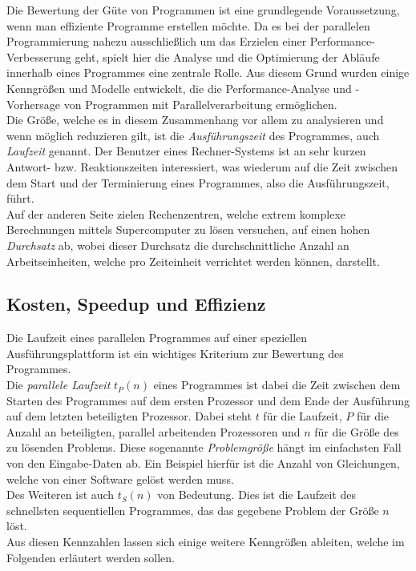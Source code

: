 		Die Bewertung der Güte von Programmen ist eine grundlegende Voraussetzung, wenn man effiziente Programme erstellen möchte. Da es bei der parallelen Programmierung nahezu ausschließlich um das Erzielen einer Performance-Verbesserung geht, spielt hier die Analyse und die Optimierung der Abläufe innerhalb eines Programmes eine zentrale Rolle. Aus diesem Grund wurden einige Kenngrößen und Modelle entwickelt, die die Performance-Analyse und -Vorhersage von Programmen mit Parallelverarbeitung ermöglichen.\\
		Die Größe, welche es in diesem Zusammenhang vor allem zu analysieren und wenn möglich reduzieren gilt, ist die \textit{Ausführungszeit} des Programmes, auch \textit{Laufzeit} genannt. Der Benutzer eines Rechner-Systems ist an sehr kurzen Antwort- bzw. Reaktionszeiten interessiert, was wiederum auf die Zeit zwischen dem Start und der Terminierung eines Programmes, also die Ausführungszeit, führt.\\
		Auf der anderen Seite zielen Rechenzentren, welche extrem komplexe Berechnungen mittels Supercomputer zu lösen versuchen, auf einen hohen \textit{Durchsatz} ab, wobei dieser Durchsatz die durchschnittliche Anzahl an Arbeitseinheiten, welche pro Zeiteinheit verrichtet werden können, darstellt. \cite{ParaProgRauber}
		
		\subsection{Kosten, Speedup und Effizienz}
		
			Die Laufzeit eines parallelen Programmes auf einer speziellen Ausführungsplattform ist ein wichtiges Kriterium zur Bewertung des Programmes.\\
			Die \textit{parallele Laufzeit} $t_P(n)$ eines Programmes ist dabei die Zeit zwischen dem Starten des Programmes auf dem ersten Prozessor und dem Ende der Ausführung auf dem letzten beteiligten Prozessor. Dabei steht $t$ für die Laufzeit, $P$ für die Anzahl an beteiligten, parallel arbeitenden Prozessoren und $n$ für die Größe des zu lösenden Problems. Diese sogenannte \textit{Problemgröße} hängt im einfachsten Fall von den Eingabe-Daten ab. Ein Beispiel hierfür ist die Anzahl von Gleichungen, welche von einer Software gelöst werden muss.\\
			Des Weiteren ist auch $t_S(n)$ von Bedeutung. Dies ist die Laufzeit des schnellsten sequentiellen Programmes, das das gegebene Problem der Größe $n$ löst.\\
			Aus diesen Kennzahlen lassen sich einige weitere Kenngrößen ableiten, welche im Folgenden erläutert werden sollen. \cite{ParaProgRauber}
			
